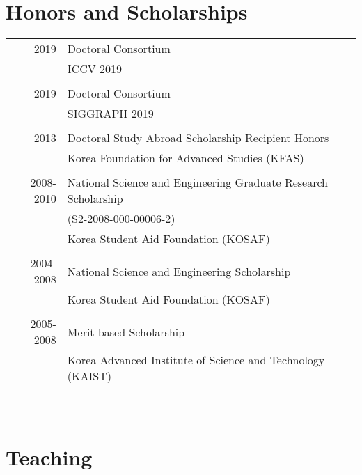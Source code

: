 \documentclass[letterpaper,10pt]{article} %
\newcommand{\blankline}{\quad\pagebreak[2]}
\begin{document}
{\begin{enumerate}
\end{enumerate}

\blankline



\section{Honors and Scholarships}

\begin{tabular}{r|p{11cm}}

2019 & Doctoral Consortium\\
& ICCV 2019\\
&\\
2019 & Doctoral Consortium\\
& SIGGRAPH 2019\\
&\\
2013 & Doctoral Study Abroad Scholarship Recipient Honors\\
& Korea Foundation for Advanced Studies (KFAS)\\
&\\
2008-2010 & National Science and Engineering Graduate Research Scholarship\\
& (S2-2008-000-00006-2)\\
& Korea Student Aid Foundation (KOSAF)\\
&\\
2004-2008 & National Science and Engineering Scholarship \\
& Korea Student Aid Foundation (KOSAF)\\
&\\
2005-2008 & Merit-based Scholarship\\
& Korea Advanced Institute of Science and Technology (KAIST)\\
&\\
\end{tabular}\\

\blankline



\section{Teaching}

}
\end{document}
